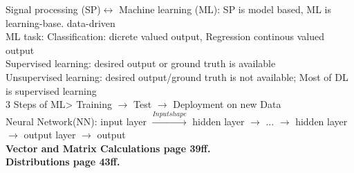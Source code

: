 \documentclass{notes}
\begin{document}
%


\tableofcontents

\clearpage
\renewcommand{\thepage}{\arabic{page}}
\setcounter{page}{1}
Signal processing (SP)$ \leftrightarrow $ Machine learning (ML): SP is model based, ML is learning-base. data-driven\\
ML task: Classification: dicrete valued output, Regression continous valued output\\
Supervised learning: desired output or ground truth is available \\
Unsupervised learning: desired output/ground truth is not available; Most of DL is supervised learning \\
3 Steps of ML> Training $ \rightarrow $ Test $ \rightarrow $ Deployment on new Data \\
Neural Network(NN): input layer $ \overset{Input shape}{\rightarrow }  $ hidden layer $ \rightarrow $ ... $ \rightarrow $ hidden layer $ \rightarrow $ output layer $ \rightarrow $ output\\
\textbf{Vector and Matrix Calculations page 39ff.}\\
\textbf{Distributions page 43ff.}\\
\end{document}
